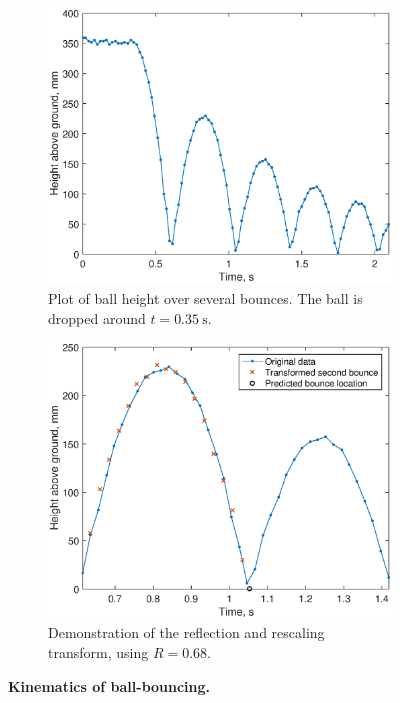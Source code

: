 \documentclass[letterpaper, 11pt]{article}
\begin{document}
\begin{figure}[ht]
    \centering
    \begin{subfigure}[t]{0.48\textwidth}
        \includegraphics[width=\textwidth]{images/fig_bounce.eps}
        \caption{Plot of ball height over several bounces. The ball is dropped around $t = \SI{0.35}{\second}$.}
        \label{fig:bounce}
    \end{subfigure}\hfill
    \begin{subfigure}[t]{0.48\textwidth}
        \includegraphics[width=\textwidth]{images/fig_transform.eps}
        \caption{Demonstration of the reflection and rescaling transform, using $R = 0.68$.}
        \label{fig:transform}
    \end{subfigure}
    \caption{\textbf{Kinematics of ball-bouncing.}}
\end{figure}
\end{document}
